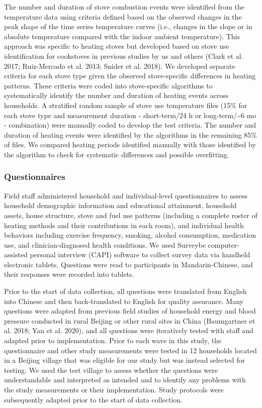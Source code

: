 \documentclass[
  letterpaper,
  DIV=11,
  numbers=noendperiod]{scrartcl}
\begin{document}
The number and duration of stove combustion events were identified from
the temperature data using criteria defined based on the observed
changes in the peak shape of the time series temperature curves (i.e.,
changes in the slope or in absolute temperature compared with the indoor
ambient temperature). This approach was specific to heating stoves but
developed based on stove use identification for cookstoves in previous
studies by us and others (Clark et al. 2017; Ruiz-Mercado et al. 2013;
Snider et al. 2018). We developed separate criteria for each stove type
given the observed stove-specific differences in heating patterns. These
criteria were coded into stove-specific algorithms to systematically
identify the number and duration of heating events across households. A
stratified random sample of stove use temperature files (15\% for each
stove type and measurement duration - short-term/24 h or
long-term/\textasciitilde6 mo - combination) were manually coded to
develop the test criteria. The number and duration of heating events
were identified by the algorithms in the remaining 85\% of files. We
compared heating periods identified manually with those identified by
the algorithm to check for systematic differences and possible
overfitting.

\subsubsection{Questionnaires}\label{questionnaires}

Field staff administered household and individual-level questionnaires
to assess household demographic information and educational attainment,
household assets, house structure, stove and fuel use patterns
(including a complete roster of heating methods and their contributions
in each room), and individual health behaviors including exercise
frequency, smoking, alcohol consumption, medication use, and
clinician-diagnosed health conditions. We used Surveybe
computer-assisted personal interview (CAPI) software to collect survey
data via handheld electronic tablets. Questions were read to
participants in Mandarin-Chinese, and their responses were recorded into
tablets.

Prior to the start of data collection, all questions were translated
from English into Chinese and then back-translated to English for
quality assurance. Many questions were adapted from previous field
studies of household energy and blood pressure conducted in rural
Beijing or other rural sites in China (Baumgartner et al. 2018; Yan et
al. 2020), and all questions were iteratively tested with staff and
adapted prior to implementation. Prior to each wave in this study, the
questionnaire and other study measurements were tested in 12 households
located in a Beijing village that was eligible for our study but was
instead selected for testing. We used the test village to assess whether
the questions were understandable and interpreted as intended and to
identify any problems with the study measurements or their
implementation. Study protocols were subsequently adapted prior to the
start of data collection.
\end{document}
